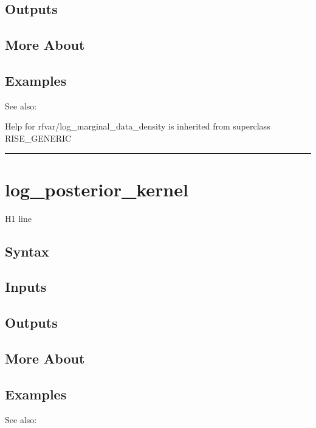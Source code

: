 \documentclass[letterpaper,10pt,english]{sphinxmanual}
\begin{document}
\subsection{Outputs}
\label{classes/models/@rfvar/rfvar:id65}

\subsection{More About}
\label{classes/models/@rfvar/rfvar:id66}

\subsection{Examples}
\label{classes/models/@rfvar/rfvar:id67}
See also:

Help for rfvar/log\_marginal\_data\_density is inherited from superclass RISE\_GENERIC


\bigskip\hrule{}\bigskip



\section{log\_posterior\_kernel}
\label{classes/models/@rfvar/rfvar:log-posterior-kernel}\label{classes/models/@rfvar/rfvar:id68}
H1 line


\subsection{Syntax}
\label{classes/models/@rfvar/rfvar:id69}

\subsection{Inputs}
\label{classes/models/@rfvar/rfvar:id70}

\subsection{Outputs}
\label{classes/models/@rfvar/rfvar:id71}

\subsection{More About}
\label{classes/models/@rfvar/rfvar:id72}

\subsection{Examples}
\label{classes/models/@rfvar/rfvar:id73}
See also:
\end{document}
